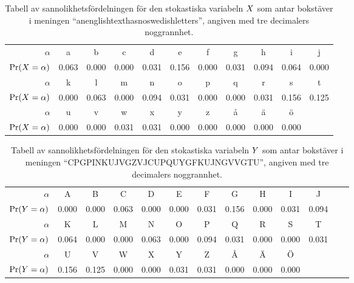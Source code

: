 \begin{table}
  \caption{%
    Tabell av sannolikhetsfördelningen för den stokastiska variabeln \(\relax{X}\) som 
    antar bokstäver i meningen \enquote{anenglishtexthasnoswedishletters}, 
    angiven med tre decimalers noggrannhet.
  }\label{tbl:SannolikhetstabellKlartext}
	\centering
  \begin{tabular}{rcccccccccc}
    \toprule
    \(\alpha\) & a & b & c & d & e & f & g & h & i & j  \\
    \(\Pr(\relax{X} = \alpha)\) & 0.063  & 0.000 & 0.000 & 0.031 & 0.156 & 0.000 
    & 0.031 & 0.094 & 0.064 & 0.000 \\
    \midrule
    \(\alpha\) & k & l & m & n & o & p & q & r & s & t \\
    \(\Pr(\relax{X} = \alpha)\) & 0.000 & 0.063 & 0.000 & 0.094 & 0.031 & 0.000 
    & 0.000 & 0.031 & 0.156 & 0.125 \\
    \midrule
    \(\alpha\) & u & v & w & x & y & z & å & ä & ö \\
    \(\Pr(\relax{X} = \alpha)\) & 0.000 & 0.000 & 0.031 & 0.031 & 0.000 & 0.000 
    & 0.000 & 0.000 & 0.000 \\
    \bottomrule
  \end{tabular}
\end{table}
\begin{table}
  \caption{%
    Tabell av sannolikhetsfördelningen för den stokastiska variabeln \(\relax{Y}\) som 
    antar bokstäver i meningen \enquote{CPGPINKUJVGZVJCUPQUYGFKUJNGVVGTU}, 
    angiven med tre decimalers noggrannhet.
  }\label{tbl:SannolikhetstabellKryptotext}
	\centering
  \begin{tabular}{rcccccccccccc}
    \toprule
    \(\alpha\) & A & B & C & D & E & F & G & H & I & J \\
    \(\Pr(\relax{Y} = \alpha)\) & 0.000 & 0.000 & 0.063  & 0.000 & 0.000 & 0.031 
    & 0.156 & 0.000 & 0.031 & 0.094 \\
    \midrule
    \(\alpha\) & K & L & M & N & O & P & Q & R & S & T \\
    \(\Pr(\relax{Y} = \alpha)\) & 0.064 & 0.000 & 0.000 & 0.063 & 0.000 & 0.094 
    & 0.031 & 0.000 & 0.000 & 0.031 \\
    \midrule
    \(\alpha\) & U & V & W & X & Y & Z & Å & Ä & Ö \\
    \(\Pr(\relax{Y} = \alpha)\) & 0.156 & 0.125 & 0.000 & 0.000 &  0.031 & 0.031 
    & 0.000 & 0.000 & 0.000 \\
    \bottomrule
  \end{tabular}
\end{table}

